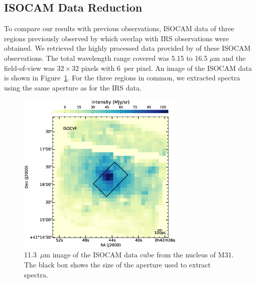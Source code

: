 


\subsection{ISOCAM Data Reduction}


To compare our results with previous observations, ISOCAM data of three regions previously observed by \citet{1998Cesarsky} which overlap 
with IRS observations were obtained. We retrieved the highly processed data provided by \citet{Boulanger_F_2005} of these ISOCAM observations. 
The total wavelength range covered was 5.15 to 16.5 $\mu$m and the field-of-view was $32\times 32$ pixels with 6\arcsec\ per pixel. 
An image of the ISOCAM data is shown in Figure~\ref{isonuc}.  For the three regions in common, we extracted spectra using the same aperture as for the IRS data. 

\begin{figure}
\centering
\includegraphics[width = 8cm]{./isonuc.eps}
\caption{11.3~$\mu$m image of the ISOCAM data cube from the nucleus of M31. The black box shows the size of the aperture used to extract spectra.}
\label{isonuc}
\end{figure}
